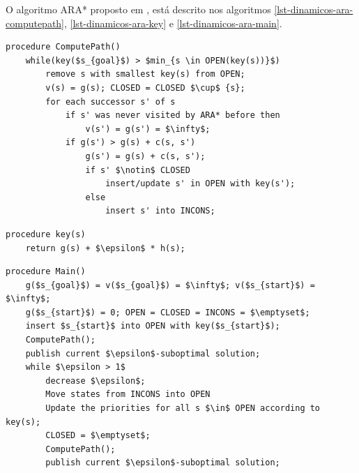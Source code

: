 O algoritmo ARA* proposto em , está descrito nos algoritmos \ref{lst-dinamicos-ara-computepath}, \ref{lst-dinamicos-ara-key} e \ref{lst-dinamicos-ara-main}.

\begin{lstlisting}[mathescape, label=lst-dinamicos-ara-computepath, caption=Algoritmo ARA* - função de cálculo de caminho, float=htpb]
procedure ComputePath()
	while(key($s_{goal}$) > $min_{s \in OPEN(key(s))}$)
		remove s with smallest key(s) from OPEN;
		v(s) = g(s); CLOSED = CLOSED $\cup$ {s};
		for each successor s' of s
			if s' was never visited by ARA* before then
				v(s') = g(s') = $\infty$;
			if g(s') > g(s) + c(s, s')
				g(s') = g(s) + c(s, s');
				if s' $\notin$ CLOSED
					insert/update s' in OPEN with key(s');
				else
					insert s' into INCONS;
\end{lstlisting}

 
\begin{lstlisting}[mathescape, label=lst-dinamicos-ara-key, caption=Algoritmo ARA* - função da chave ordenadora da fila de prioridades, float=htpb]
procedure key(s)
	return g(s) + $\epsilon$ * h(s);
\end{lstlisting}

\begin{lstlisting}[mathescape, label=lst-dinamicos-ara-main, caption=Algoritmo ARA* - função principal, float=htpb]
procedure Main()
	g($s_{goal}$) = v($s_{goal}$) = $\infty$; v($s_{start}$) = $\infty$;
	g($s_{start}$) = 0; OPEN = CLOSED = INCONS = $\emptyset$;
	insert $s_{start}$ into OPEN with key($s_{start}$);
	ComputePath();
	publish current $\epsilon$-suboptimal solution;
	while $\epsilon > 1$
		decrease $\epsilon$;
		Move states from INCONS into OPEN
		Update the priorities for all s $\in$ OPEN according to key(s);
		CLOSED = $\emptyset$;
		ComputePath();
		publish current $\epsilon$-suboptimal solution;
\end{lstlisting}

